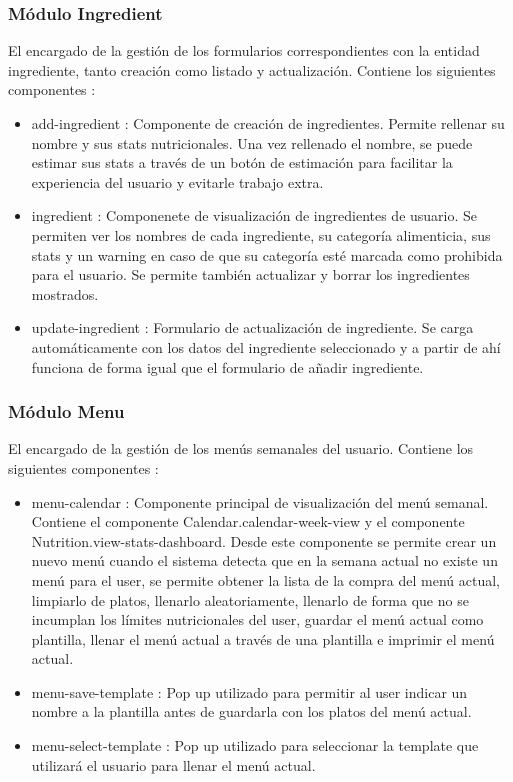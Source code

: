 \documentclass[12pt, a4paper, twoside]{book}
\begin{document}
	\subsubsection{Módulo Ingredient}
	El encargado de la gestión de los formularios correspondientes con la entidad ingrediente, tanto creación como listado y actualización. Contiene los siguientes componentes : 
	\begin{itemize}
		\item add-ingredient : Componente de creación de ingredientes. Permite rellenar su nombre y sus stats nutricionales. Una vez rellenado el nombre, se puede estimar sus stats a través de un botón de estimación para facilitar la experiencia del usuario y evitarle trabajo extra.
		\item ingredient : Componenete de visualización de ingredientes de usuario. Se permiten ver los nombres de cada ingrediente, su categoría alimenticia, sus stats y un warning en caso de que su categoría esté marcada como prohibida para el usuario. Se permite también actualizar y borrar los ingredientes mostrados.
		\item update-ingredient : Formulario de actualización de ingrediente. Se carga automáticamente con los datos del ingrediente seleccionado y a partir de ahí funciona de forma igual que el formulario de añadir ingrediente.
	\end{itemize}
	\subsubsection{Módulo Menu}
	El encargado de la gestión de los menús semanales del usuario. Contiene los siguientes componentes : 
	\begin{itemize}
		\item menu-calendar : Componente principal de visualización del menú semanal. Contiene el componente Calendar.calendar-week-view y el componente Nutrition.view-stats-dashboard. Desde este componente se permite crear un nuevo menú cuando el sistema detecta que en la semana actual no existe un menú para el user, se permite obtener la lista de la compra del menú actual, limpiarlo de platos, llenarlo aleatoriamente, llenarlo de forma que no se incumplan los límites nutricionales del user, guardar el menú actual como plantilla, llenar el menú actual a través de una plantilla e imprimir el menú actual.
		\item menu-save-template : Pop up utilizado para permitir al user indicar un nombre a la plantilla antes de guardarla con los platos del menú actual.
		\item menu-select-template : Pop up utilizado para seleccionar la template que utilizará el usuario para llenar el menú actual.
	\end{itemize}
\end{document}
